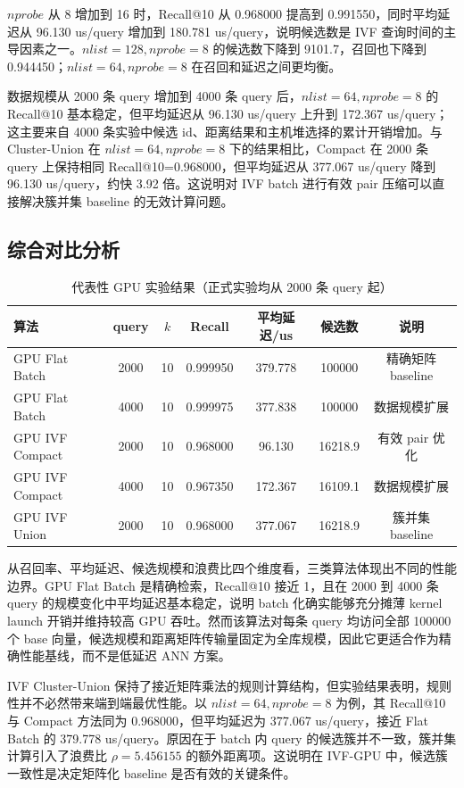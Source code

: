 \documentclass[a4paper]{article}
\begin{document}
$nprobe$ 从 8 增加到 16 时，Recall@10 从 0.968000 提高到 0.991550，同时平均延迟从 96.130 us/query 增加到 180.781 us/query，说明候选数是 IVF 查询时间的主导因素之一。$nlist=128,nprobe=8$ 的候选数下降到 9101.7，召回也下降到 0.944450；$nlist=64,nprobe=8$ 在召回和延迟之间更均衡。

数据规模从 2000 条 query 增加到 4000 条 query 后，$nlist=64,nprobe=8$ 的 Recall@10 基本稳定，但平均延迟从 96.130 us/query 上升到 172.367 us/query；这主要来自 4000 条实验中候选 id、距离结果和主机堆选择的累计开销增加。与 Cluster-Union 在 $nlist=64,nprobe=8$ 下的结果相比，Compact 在 2000 条 query 上保持相同 Recall@10=0.968000，但平均延迟从 377.067 us/query 降到 96.130 us/query，约快 3.92 倍。这说明对 IVF batch 进行有效 pair 压缩可以直接解决簇并集 baseline 的无效计算问题。

\subsection{综合对比分析}

\begin{table}[H]
\centering
\caption{代表性 GPU 实验结果（正式实验均从 2000 条 query 起）}
\begin{tabular}{lcccccc}
\toprule
算法 & query & $k$ & Recall & 平均延迟/us & 候选数 & 说明 \\
\midrule
GPU Flat Batch & 2000 & 10 & 0.999950 & 379.778 & 100000 & 精确矩阵 baseline \\
GPU Flat Batch & 4000 & 10 & 0.999975 & 377.838 & 100000 & 数据规模扩展 \\
GPU IVF Compact & 2000 & 10 & 0.968000 & 96.130 & 16218.9 & 有效 pair 优化 \\
GPU IVF Compact & 4000 & 10 & 0.967350 & 172.367 & 16109.1 & 数据规模扩展 \\
GPU IVF Union & 2000 & 10 & 0.968000 & 377.067 & 16218.9 & 簇并集 baseline \\
\bottomrule
\end{tabular}
\end{table}

从召回率、平均延迟、候选规模和浪费比四个维度看，三类算法体现出不同的性能边界。GPU Flat Batch 是精确检索，Recall@10 接近 1，且在 2000 到 4000 条 query 的规模变化中平均延迟基本稳定，说明 batch 化确实能够充分摊薄 kernel launch 开销并维持较高 GPU 吞吐。然而该算法对每条 query 均访问全部 100000 个 base 向量，候选规模和距离矩阵传输量固定为全库规模，因此它更适合作为精确性能基线，而不是低延迟 ANN 方案。

IVF Cluster-Union 保持了接近矩阵乘法的规则计算结构，但实验结果表明，规则性并不必然带来端到端最优性能。以 $nlist=64,nprobe=8$ 为例，其 Recall@10 与 Compact 方法同为 0.968000，但平均延迟为 377.067 us/query，接近 Flat Batch 的 379.778 us/query。原因在于 batch 内 query 的候选簇并不一致，簇并集计算引入了浪费比 $\rho=5.456155$ 的额外距离项。这说明在 IVF-GPU 中，候选簇一致性是决定矩阵化 baseline 是否有效的关键条件。
\end{document}
